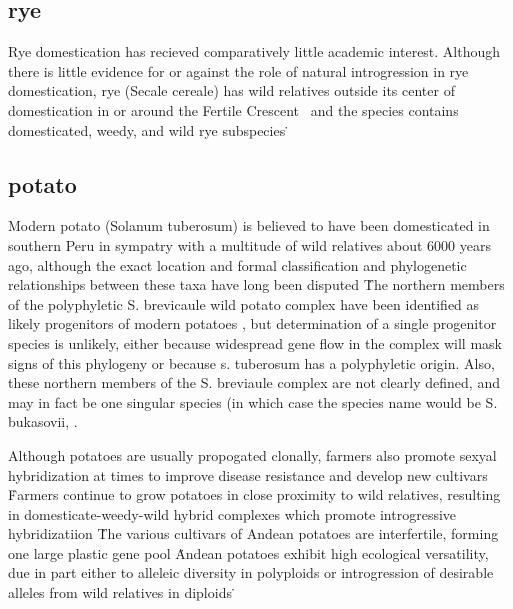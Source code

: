 \documentclass[11pt]{article}
\begin{document}
\subsection*{rye}

Rye domestication has recieved comparatively little academic interest.
Although there is little evidence for or against the role of natural introgression in rye domestication, rye (Secale cereale) has wild relatives outside its center of domestication in or around the Fertile Crescent \cite{vavilov1928geographical}\, and the species contains domesticated, weedy, and wild rye subspecies \cite{khush1961cytogenetic}\.

\subsection*{potato}

Modern potato (Solanum tuberosum) is believed to have been domesticated in southern Peru in sympatry with a multitude of wild relatives about 6000 years ago, although the exact location and formal classification and phylogenetic relationships between these taxa have long been disputed \cite{huaman2002reclassification, spooner2005single, pickersgill1977origins, hawkes1988evolution}\.
The northern members of the polyphyletic S. brevicaule wild potato complex have been identified as likely progenitors of modern potatoes \cite{correll1962potato}, but determination of a single progenitor species is unlikely, either because widespread gene flow in the complex will mask signs of this phylogeny or because s. tuberosum has a polyphyletic origin.
Also, these northern members of the S. breviaule complex are not clearly defined, and may in fact be one singular species (in which case the species name would be S. bukasovii, \cite{spooner2005single}\).





Although potatoes are usually propogated clonally, farmers also promote sexyal hybridization at times to improve disease resistance and develop new cultivars \cite{quiros1992increase}\.
Farmers continue to grow potatoes in close proximity to wild relatives, resulting in domesticate-weedy-wild hybrid complexes which promote introgressive hybridizatiion \cite{rabinowitz1990high, johns1987relationships, linder1987diversity}\.

The various cultivars of Andean potatoes are interfertile, forming one large plastic gene pool \cite{quiros1992increase}\.
Andean potatoes exhibit high ecological versatility, due in part either to alleleic diversity in polyploids or introgression of desirable alleles from wild relatives in diploids \cite{zimmerer1998ecogeography}\.
\end{document}
